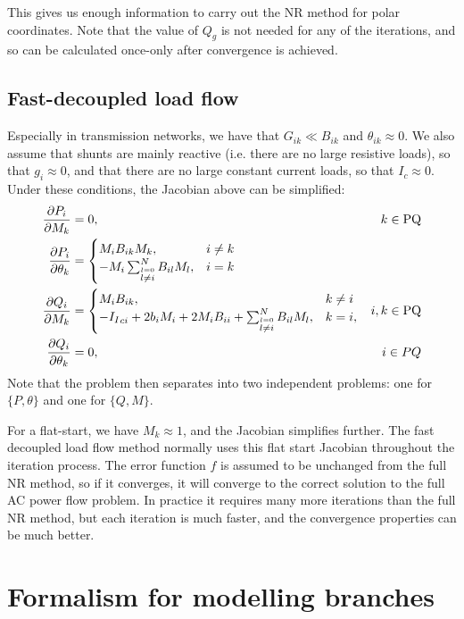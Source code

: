 \documentclass[11pt]{article}
\newcommand{\Ii}{{I_I}}
\begin{document}
This gives us enough information to carry out the NR method for polar coordinates. Note that the value of $Q_g$ is not needed for any of the iterations, and so can be calculated once-only after convergence is achieved.

\subsection{Fast-decoupled load flow}
Especially in transmission networks, we have that $G_{ik} \ll B_{ik}$ and $\theta_{ik} \approx 0$. We also assume that shunts are mainly reactive (i.e. there are no large resistive loads), so that $g_i \approx 0$, and that there are no large constant current loads, so that $I_c \approx 0$. Under these conditions, the Jacobian above can be simplified:
\begin{align}
	\frac{\partial P_i}{\partial \M{k}} &= 0, & k \in \text{PQ} \notag \\
	\frac{\partial P_i}{\partial \theta_k} &= 
		\begin{cases}
			\M{i}B_{ik}\M{k}, & i \ne k \\
			-\M{i}\sum_{\stackrel{l = 0}{l \ne i}}^NB_{il}\M{l}, &i = k
		\end{cases} \notag \\
	\frac{\partial Q_i}{\partial \M{k}} &= 
		\begin{cases}
			\M{i}B_{ik}, & k \ne i \\
			-\Ii_{ci} + 2b_i\M{i} + 2 \M{i}B_{ii} + \sum_{\stackrel{l = 0}{l \ne i}}^N{B_{il}M_l}, & k = i,
		\end{cases} & i, k \in \text{PQ} \notag \\
	\frac{\partial Q_i}{\partial \theta_k} &= 0, & i \in PQ
\end{align}
Note that the problem then separates into two independent problems: one for $\{P, \theta\}$ and one for $\{Q, M\}$. 

For a flat-start, we have $M_k \approx 1$, and the Jacobian simplifies further. The fast decoupled load flow method normally uses this flat start Jacobian throughout the iteration process. The error function $f$ is assumed to be unchanged from the full NR method, so if it converges, it will converge to the correct solution to the full AC power flow problem. In practice it requires many more iterations than the full NR method, but each iteration is much faster, and the convergence properties can be much better.

\section{Formalism for modelling branches}
\end{document}

